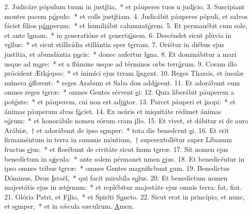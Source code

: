 2. Judicáre pópulum tuum in just\uline{í}tia,~* et páuperes tuos n jud\uline{í}cio.
3. Suscípiant montes pacem p\uline{ó}pulo:~* et colls just\uline{í}tiam.
4. Judicábit páuperes pópuli, et salvos fáciet fílios p\uline{áu}perum:~* et humiliábit calumnat\uline{ó}rem.
5. Et permanébit cum sole, et ante l\uline{u}nam,~* in generatióne et generti\uline{ó}nem.
6. Descéndet sicut plúvia in v\uline{e}llus:~* et sicut stillicídia stillántia sper t\uline{e}rram.
7. Oriétur in diébus ejus justítia, et abundántia p\uline{a}cis:~* donec aufertur l\uline{u}na.
8. Et dominábitur a mari usque ad m\uline{a}re:~* et a flúmine usque ad términos orbs terr\uline{á}rum.
9. Coram illo prócident Æth\uline{í}opes:~* et inimíci ejus trram l\uline{i}ngent.
10. Reges Tharsis, et ínsulæ múnera \uline{ó}fferent:~* reges Arabum et Saba don add\uline{ú}cent.
11. Et adorábunt eum omnes reges t\uline{e}rræ:~* omnes Gentes sérvent \uline{e}i:
12. Quia liberábit páuperem a pot\uline{é}nte:~* et páuperem, cui non ert adj\uline{ú}tor.
13. Parcet páuperi et \uline{í}nopi:~* et ánimas páuperum slvas f\uline{á}ciet.
14. Ex usúris et iniquitáte rédimet ánimas e\uline{ó}rum:~* et honorábile nomen eórum cram \uline{i}llo.
15. Et vivet, et dábitur ei de auro Arábiæ,~† et adorábunt de ipso s\uline{e}mper:~* tota die benedcent \uline{e}i.
16. Et erit firmaméntum in terra in summis móntium,~† superextollétur super Líbanum fructus \uline{e}jus:~* et florébunt de civitáte sicut fnum t\uline{e}rræ.
17. Sit nomen ejus benedíctum in s\uline{ǽ}cula:~* ante solem pérmanet nmen \uline{e}jus.
18. Et benedicéntur in ipso omnes tribus t\uline{e}rræ:~* omnes Gentes magnificbunt \uline{e}um.
19. Benedíctus Dóminus, Deus \uline{I}sraël,~* qui facit mirabíla s\uline{o}lus.
20. Et benedíctum nomen majestátis ejus in æt\uline{é}rnum:~* et replébitur majestáte ejus omnis terra: fat, f\uline{i}at.
21. Glória Patri, et F\uline{í}lio,~* et Spiríti S\uline{a}ncto.
22. Sicut erat in princípio, et nunc, et s\uline{e}mper,~* et in sǽcula sæculrum. \uline{A}men.
